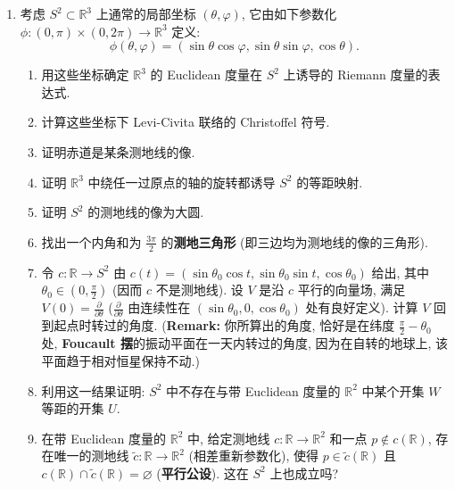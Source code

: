 \begin{enumerate}[label=(\arabic*),ref=\arabic*,leftmargin=*]
\item\label{ex:spherical-geodesics-and-transport}
考虑 $S^2\subset\mathbb{R}^3$ 上通常的局部坐标 $(\theta,\varphi)$, 它由如下参数化 $\phi:(0,\pi)\times(0,2\pi)\to\mathbb{R}^3$ 定义:
\[
  \phi(\theta,\varphi)=(\sin\theta\cos\varphi,\sin\theta\sin\varphi,\cos\theta).
\]
\begin{enumerate}[label=(\alph*),leftmargin=*]
\item 用这些坐标确定 $\mathbb{R}^3$ 的 Euclidean 度量在 $S^2$ 上诱导的 Riemann 度量的表达式.
\item 计算这些坐标下 Levi-Civita 联络的 Christoffel 符号.
\item 证明赤道是某条测地线的像.
\item 证明 $\mathbb{R}^3$ 中绕任一过原点的轴的旋转都诱导 $S^2$ 的等距映射.
\item 证明 $S^2$ 的测地线的像为大圆.
\item 找出一个内角和为 $\frac{3\pi}{2}$ 的\textbf{测地三角形} (即三边均为测地线的像的三角形).
\item 令 $c:\mathbb{R}\to S^2$ 由 $c(t)=(\sin\theta_0\cos t,\sin\theta_0\sin t,\cos\theta_0)$ 给出, 其中 $\theta_0\in(0,\frac{\pi}{2})$ (因而 $c$ 不是测地线). 设 $V$ 是沿 $c$ 平行的向量场, 满足 $V(0)=\frac{\partial}{\partial\theta}$ ($\frac{\partial}{\partial\theta}$ 由连续性在 $(\sin\theta_0,0,\cos\theta_0)$ 处有良好定义). 计算 $V$ 回到起点时转过的角度.
{\small (\textbf{Remark:} 你所算出的角度, 恰好是在纬度 $\frac{\pi}{2}-\theta_0$ 处, \textbf{Foucault 摆}的振动平面在一天内转过的角度, 因为在自转的地球上, 该平面趋于相对恒星保持不动.)}
\item 利用这一结果证明: $S^2$ 中不存在与带 Euclidean 度量的 $\mathbb{R}^2$ 中某个开集 $W$ 等距的开集 $U$.
\item 在带 Euclidean 度量的 $\mathbb{R}^2$ 中, 给定测地线 $c:\mathbb{R}\to\mathbb{R}^2$ 和一点 $p\notin c(\mathbb{R})$, 存在唯一的测地线 $\widetilde c:\mathbb{R}\to\mathbb{R}^2$ (相差重新参数化), 使得 $p\in\widetilde c(\mathbb{R})$ 且 $c(\mathbb{R})\cap\widetilde c(\mathbb{R})=\varnothing$ (\textbf{平行公设}). 这在 $S^2$ 上也成立吗?
\end{enumerate}


\end{enumerate}
